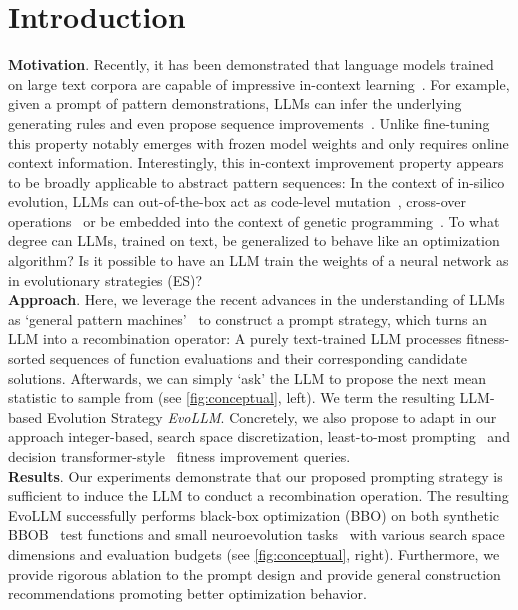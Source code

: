 \documentclass[sigconf]{acmart}
\begin{document}
\section{Introduction}
\textbf{Motivation}. Recently, it has been demonstrated that language models trained on large text corpora are capable of impressive in-context learning~\cite{brown2020language}. For example, given a prompt of pattern demonstrations, LLMs can infer the underlying generating rules and even propose sequence improvements~\cite{mirchandani2023large}.
Unlike fine-tuning this property notably emerges with frozen model weights and only requires online context information. Interestingly, this in-context improvement property appears to be broadly applicable to abstract pattern sequences: In the context of in-silico evolution, LLMs can out-of-the-box act as code-level mutation~\cite{chen2023evoprompting}, cross-over operations~\cite{meyerson2023language} or be embedded into the context of genetic programming~\cite{lehman2023evolution}.
To what degree can LLMs, trained on text, be generalized to behave like an optimization algorithm? Is it possible to have an LLM train the weights of a neural network as in evolutionary strategies (ES)? \\
\textbf{Approach}. Here, we leverage the recent advances in the understanding of LLMs as ‘general pattern machines’~\cite{mirchandani2023large} to construct a prompt strategy, which turns an LLM into a recombination operator:  A purely text-trained LLM processes fitness-sorted sequences of function evaluations and their corresponding candidate solutions. Afterwards, we can simply `ask' the LLM to propose the next mean statistic to sample from (see \cref{fig:conceptual}, left). We term the resulting LLM-based Evolution Strategy \textit{EvoLLM}. Concretely, we also propose to adapt in our approach integer-based, search space discretization, least-to-most prompting~\cite{zhou2022least} and decision transformer-style~\cite{chen2021decision} fitness improvement queries.\\
\textbf{Results}. Our experiments demonstrate that our proposed prompting strategy is sufficient to induce the LLM to conduct a recombination operation. The resulting EvoLLM successfully performs black-box optimization (BBO) on both synthetic BBOB~\cite{hansen2010real} test functions and small neuroevolution tasks~\cite{brockman2016openai, gymnax2022github} with various search space dimensions and evaluation budgets (see \cref{fig:conceptual}, right). Furthermore, we provide rigorous ablation to the prompt design and provide general construction recommendations promoting better optimization behavior.
\end{document}
